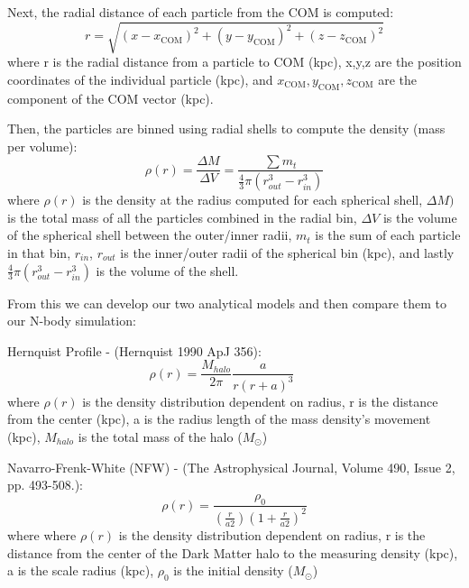 \documentclass[fleqn,usenatbib]{mnras}
\begin{document}
Next, the radial distance of each particle from the COM is computed:
\begin{equation}
    r = \sqrt{(x-x_{\text{COM}})^2+(y-y_{\text{COM}})^2+(z-z_{\text{COM}})^2}
	\label{eq:radial}
\end{equation}
where r is the radial distance from a particle to COM (kpc), x,y,z are the position coordinates of the individual particle (kpc), and \(x_{\text{COM}}, y_{\text{COM}}, z_{\text{COM}}\) are the component of the COM vector (kpc).

Then, the particles are binned using radial shells to compute the density (mass per volume):
\begin{equation}
    \rho(r) = \frac{\Delta M}{\Delta V}= \frac{\sum m_t}{\frac{4}{3}\pi(r^3_{out}-r^3_{in})}
	\label{eq:bins}
\end{equation}
where \(\rho (r)\) is the density at the radius computed for each spherical shell, \(\Delta M)\) is the total mass of all the particles combined in the radial bin, \(\Delta V\) is the volume of the spherical shell between the outer/inner radii, \(m_t\) is the sum of each particle in that bin, \(r_{in}\), \(r_{out}\) is the inner/outer radii of the spherical bin (kpc), and lastly \(\frac 43 \pi (r^3_{out}-r^3_{in})\) is the volume of the shell.

From this we can develop our two analytical models and then compare them to our N-body simulation:

Hernquist Profile - (Hernquist 1990 ApJ 356):
\begin{equation}
    \rho(r) =  \frac{M_{halo}}{2\pi} \frac{a}{r(r+a)^3} \qquad  
	\label{eq:herquist}
\end{equation}
where \(\rho(r)\) is the density distribution dependent on radius, r is the distance from the center (kpc), a is the radius length  of the mass density's movement (kpc), \(M_{halo}\) is the total mass of the halo (\(M_\odot\)) 

Navarro-Frenk-White (NFW) - (The Astrophysical Journal, Volume 490, Issue 2, pp. 493-508.):
\begin{equation}
    \rho(r) =  \frac{\rho_0}{\left( \frac{r}{a2} \right)\left( 1 + \frac{r}{a2} \right)^2}  
	\label{eq:NFW}
\end{equation}
where where \(\rho(r)\) is the density distribution dependent on radius, r is the distance from the center of the Dark Matter halo to the measuring density (kpc), a is the scale radius (kpc), \(\rho_{0}\) is the initial density (\(M_\odot\))
\end{document}

